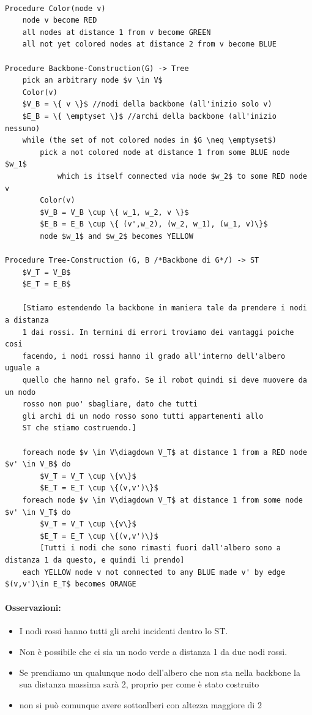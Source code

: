 \begin{lstlisting}

Procedure Color(node v)
	node v become RED
	all nodes at distance 1 from v become GREEN
	all not yet colored nodes at distance 2 from v become BLUE
	
Procedure Backbone-Construction(G) -> Tree
	pick an arbitrary node $v \in V$
	Color(v)
	$V_B = \{ v \}$ //nodi della backbone (all'inizio solo v)
	$E_B = \{ \emptyset \}$ //archi della backbone (all'inizio nessuno)
	while (the set of not colored nodes in $G \neq \emptyset$)
		pick a not colored node at distance 1 from some BLUE node $w_1$ 
			which is itself connected via node $w_2$ to some RED node v
		Color(v)
		$V_B = V_B \cup \{ w_1, w_2, v \}$
		$E_B = E_B \cup \{ (v',w_2), (w_2, w_1), (w_1, v)\}$
		node $w_1$ and $w_2$ becomes YELLOW
		
Procedure Tree-Construction (G, B /*Backbone di G*/) -> ST
	$V_T = V_B$
	$E_T = E_B$
	
	[Stiamo estendendo la backbone in maniera tale da prendere i nodi a distanza
    1 dai rossi. In termini di errori troviamo dei vantaggi poiche cosi
	facendo, i nodi rossi hanno il grado all'interno dell'albero uguale a
    quello che hanno nel grafo. Se il robot quindi si deve muovere da un nodo
    rosso non puo' sbagliare, dato che tutti 
    gli archi di un nodo rosso sono tutti appartenenti allo
    ST che stiamo costruendo.]
	
	foreach node $v \in V\diagdown V_T$ at distance 1 from a RED node $v' \in V_B$ do
		$V_T = V_T \cup \{v\}$
		$E_T = E_T \cup \{(v,v')\}$
	foreach node $v \in V\diagdown V_T$ at distance 1 from some node $v' \in V_T$ do
		$V_T = V_T \cup \{v\}$
		$E_T = E_T \cup \{(v,v')\}$ 
		[Tutti i nodi che sono rimasti fuori dall'albero sono a distanza 1 da questo, e quindi li prendo]
    each YELLOW node v not connected to any BLUE made v' by edge $(v,v')\in E_T$ becomes ORANGE
\end{lstlisting}

\paragraph{Osservazioni:}
\begin{itemize}
    \item I nodi rossi hanno tutti gli archi incidenti dentro lo ST.
    \item Non è possibile che ci sia un nodo verde a distanza 1 da due nodi rossi.
    \item Se prendiamo un qualunque nodo dell'albero che non sta nella backbone la
          sua distanza massima sarà 2, proprio per come è stato costruito
    \item non si può comunque avere sottoalberi con altezza maggiore di 2
\end{itemize}


